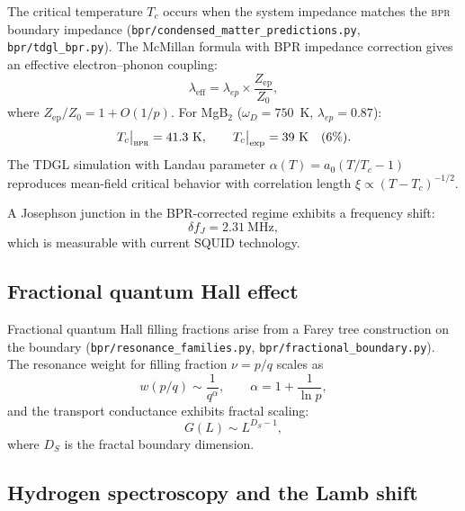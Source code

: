\documentclass[aps,prd,twocolumn,superscriptaddress,longbibliography,nofootinbib]{revtex4-2}
\newcommand{\Zimp}{Z}
\newcommand{\Zvac}{Z_0}
\newcommand{\bpr}{\textsc{bpr}}
\begin{document}
The critical temperature $T_c$ occurs when the system impedance
matches the \bpr{} boundary impedance
(\texttt{bpr/condensed\_matter\_predictions.py},
\texttt{bpr/tdgl\_bpr.py}).  The McMillan formula with BPR
impedance correction gives an effective electron--phonon coupling:
\begin{equation}
\lambda_{\mathrm{eff}} = \lambda_{ep} \times
  \frac{\Zimp_{\mathrm{ep}}}{\Zvac},
\label{eq:lambda_eff}
\end{equation}
where $\Zimp_{\mathrm{ep}}/\Zvac = 1 + O(1/p)$.  For MgB$_2$
($\omega_D = 750$~K, $\lambda_{ep} = 0.87$):
\begin{equation}
T_c\big|_{\bpr} = 41.3~\text{K}, \qquad
T_c\big|_{\mathrm{exp}} = 39~\text{K} \quad (6\%).
\label{eq:Tc_mgb2}
\end{equation}
The TDGL simulation with Landau parameter $\alpha(T) = a_0(T/T_c -
1)$ reproduces mean-field critical behavior with correlation length
$\xi \propto (T - T_c)^{-1/2}$.

A Josephson junction in the BPR-corrected regime exhibits a
frequency shift:
\begin{equation}
\delta f_J = 2.31~\text{MHz},
\label{eq:josephson}
\end{equation}
which is measurable with current SQUID technology.

\subsection{Fractional quantum Hall effect}

Fractional quantum Hall filling fractions arise from a Farey tree
construction on the boundary
(\texttt{bpr/resonance\_families.py},
\texttt{bpr/fractional\_boundary.py}).  The resonance weight for
filling fraction $\nu = p/q$ scales as
\begin{equation}
w(p/q) \sim \frac{1}{q^\alpha}, \qquad
\alpha = 1 + \frac{1}{\ln p},
\label{eq:fqhe}
\end{equation}
and the transport conductance exhibits fractal scaling:
\begin{equation}
G(L) \sim L^{D_S - 1},
\label{eq:fqhe_transport}
\end{equation}
where $D_S$ is the fractal boundary dimension.

\subsection{Hydrogen spectroscopy and the Lamb shift}
\end{document}
